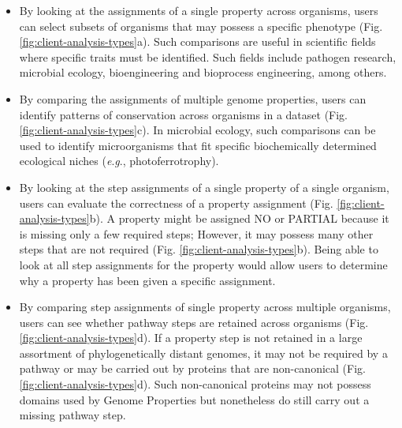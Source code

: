 \FloatBarrier
\begin{itemize}
\item By looking at the assignments of a single property across organisms, users 
can select subsets of organisms that may possess a specific phenotype (Fig. 
\ref{fig:client-analysis-types}a). Such comparisons are useful in scientific 
fields where specific traits must be identified. Such fields include pathogen 
research, microbial ecology, bioengineering and bioprocess engineering, among 
others.
\item By comparing the assignments of multiple genome properties, users can 
identify patterns of conservation across organisms in a dataset (Fig. 
\ref{fig:client-analysis-types}c). In microbial ecology, such comparisons can be 
used to identify microorganisms that fit specific biochemically determined 
ecological niches (\textit{e}.\textit{g}., photoferrotrophy).
\item By looking at the step assignments of a single property of a single 
organism, users can evaluate the correctness of a property assignment (Fig. 
\ref{fig:client-analysis-types}b). A property might be assigned NO or PARTIAL 
because it is missing only a few required steps; However, it may possess many 
other steps that are not required (Fig. \ref{fig:client-analysis-types}b). Being 
able to look at all step assignments for the property would allow users to 
determine why a property has been given a specific assignment.
\item By comparing step assignments of single property across multiple 
organisms, users can see whether pathway steps are retained across organisms 
(Fig. \ref{fig:client-analysis-types}d). If a property step is not retained in a 
large assortment of phylogenetically distant genomes, it may not be required by 
a pathway or may be carried out by proteins that are non-canonical (Fig. 
\ref{fig:client-analysis-types}d). Such non-canonical proteins may not possess 
domains used by Genome Properties but nonetheless do still carry out a missing 
pathway step.
\end{itemize}

